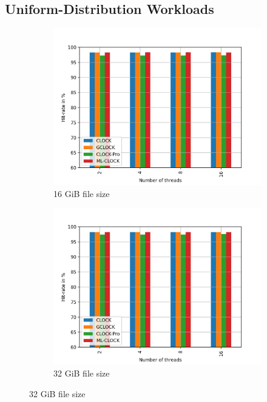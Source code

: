 \documentclass[
	12pt,
	a4paper,
	abstract,
	bibliography=totoc,
	chapterprefix,
	headings=openright,
	numbers=endperiod,
	parskip=half,
	twoside,
]{scrreprt}
\begin{document}
\subsection{Uniform-Distribution Workloads}
\begin{figure}[H]
	\centering
	\begin{subfigure}{0.4\textwidth}
		\includegraphics[width=\textwidth]{multi_16_gb_randread_uniform.jpg}		
		\caption{16 GiB file size}
		\label{fig:rw_90to10  zipf}
	\end{subfigure}
	\hfill
	\begin{subfigure}{0.4\textwidth}
		\includegraphics[width=\textwidth]{multi_32_gb_randread_uniform.jpg}		
		\caption{32 GiB file size}
		\label{fig:rw_90to10  normal}

\end{subfigure}
\end{figure}
\end{document}
